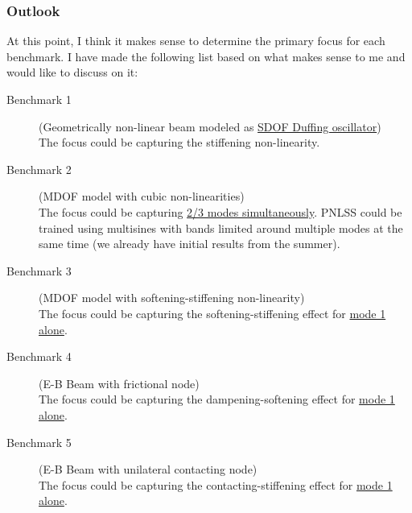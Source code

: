 \documentclass[aspectratio=169]{beamer}
\begin{document}
\begin{frame}
  \frametitle{Outlook}
  At this point, I think it makes sense to determine the primary focus
  for each benchmark. I have made the following list based on what
  makes sense to me and would like to discuss on it:
  \begin{description}
  \item[Benchmark 1] (Geometrically non-linear beam modeled as
    \underline{SDOF Duffing oscillator})\\
    The focus could be capturing the stiffening non-linearity.
  \item[Benchmark 2] (MDOF model with cubic non-linearities)\\
    The focus could be capturing \underline{2/3 modes simultaneously}. PNLSS
    could be trained using multisines with bands limited around
    multiple modes at the same time (we already have initial results
    from the summer).
  \item[Benchmark 3] (MDOF model with softening-stiffening
    non-linearity)\\
    The focus could be capturing the softening-stiffening effect for
    \underline{mode 1 alone}.
  \item[Benchmark 4] (E-B Beam with frictional node)\\
    The focus could be capturing the dampening-softening effect for
    \underline{mode 1 alone}.
  \item[Benchmark 5] (E-B Beam with unilateral contacting node)\\
    The focus could be capturing the contacting-stiffening effect for
    \underline{mode 1 alone}.
  \end{description}
\end{frame}
\end{document}
